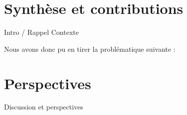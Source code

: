 \label{conclusion}
\section{Synthèse et contributions}
Intro / Rappel Contexte

Nous avons donc pu en tirer la problématique suivante :


\section{Perspectives}


Discussion et perspectives
